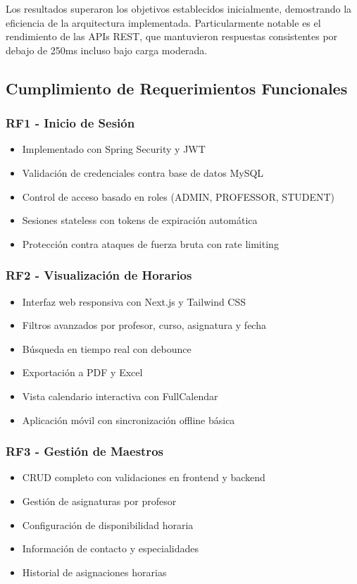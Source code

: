 Los resultados superaron los objetivos establecidos inicialmente, demostrando la eficiencia de la arquitectura implementada. Particularmente notable es el rendimiento de las APIs REST, que mantuvieron respuestas consistentes por debajo de 250ms incluso bajo carga moderada.

\subsection{Cumplimiento de Requerimientos Funcionales}

\subsubsection{RF1 - Inicio de Sesión}
\begin{itemize}
\item Implementado con Spring Security y JWT
\item Validación de credenciales contra base de datos MySQL
\item Control de acceso basado en roles (ADMIN, PROFESSOR, STUDENT)
\item Sesiones stateless con tokens de expiración automática
\item Protección contra ataques de fuerza bruta con rate limiting
\end{itemize}

\subsubsection{RF2 - Visualización de Horarios}
\begin{itemize}
\item Interfaz web responsiva con Next.js y Tailwind CSS
\item Filtros avanzados por profesor, curso, asignatura y fecha
\item Búsqueda en tiempo real con debounce
\item Exportación a PDF y Excel
\item Vista calendario interactiva con FullCalendar
\item Aplicación móvil con sincronización offline básica
\end{itemize}

\subsubsection{RF3 - Gestión de Maestros}
\begin{itemize}
\item CRUD completo con validaciones en frontend y backend
\item Gestión de asignaturas por profesor
\item Configuración de disponibilidad horaria
\item Información de contacto y especialidades
\item Historial de asignaciones horarias
\end{itemize}

